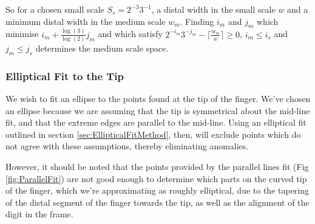 So for a chosen small scale $S_s = 2^{-3} 3^{-1}$, a distal width in the small scale $w$ and a minimum distal width in the medium scale $w_m$. 
Finding  $i_m$ and $j_m$ which minimise $i_m + \frac{\log(3)}{\log(2)} j_m$  and which satisfy  $2^{-i_m} 3^{-j_m} - \lceil \frac{w_m}{w} \rceil \ge 0$, $i_m\le i_s$ and $j_m \le j_s$ determines the medium scale space.

\subsubsection{Elliptical Fit to the Tip}\label{sec:EllipticalFitToTheTip}

We wish to fit an ellipse to the points found at the tip of the finger. We've chosen an ellipse because we are assuming that the tip is symmetrical about the mid-line fit, and that the extreme edges are parallel to the mid-line. Using an elliptical fit outlined in section \ref{sec:EllipticalFitMethod}, then, will exclude points which do not agree with these assumptions, thereby eliminating anomalies.

However, it should be noted that the points provided by the parallel lines fit (Fig \ref{fig:ParallelFit}) are not good enough to determine which parts on the curved tip of the finger, which we're approximating as roughly elliptical, due to the tapering of the distal segment of the finger towards the tip, as well as the alignment of the digit in the frame.


